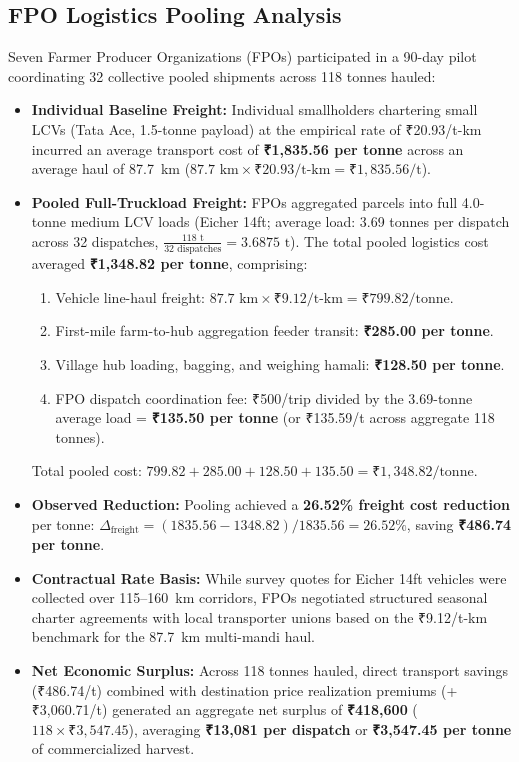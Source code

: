 \documentclass[journal]{IEEEtran}
\begin{document}
\subsection{FPO Logistics Pooling Analysis}
Seven Farmer Producer Organizations (FPOs) participated in a 90-day pilot coordinating 32 collective pooled shipments across 118 tonnes hauled:
\begin{itemize}
    \item \textbf{Individual Baseline Freight:} Individual smallholders chartering small LCVs (Tata Ace, 1.5-tonne payload) at the empirical rate of ₹20.93/t-km incurred an average transport cost of \textbf{₹1,835.56 per tonne} across an average haul of 87.7~km ($87.7\text{ km} \times \text{₹}20.93/\text{t-km} = \text{₹}1,835.56/\text{t}$).
    \item \textbf{Pooled Full-Truckload Freight:} FPOs aggregated parcels into full 4.0-tonne medium LCV loads (Eicher 14ft; average load: 3.69 tonnes per dispatch across 32 dispatches, $\frac{118\text{ t}}{32\text{ dispatches}} = 3.6875\text{ t}$). The total pooled logistics cost averaged \textbf{₹1,348.82 per tonne}, comprising:
    \begin{enumerate}
        \item Vehicle line-haul freight: $87.7\text{ km} \times \text{₹}9.12/\text{t-km} = \text{₹}799.82/\text{tonne}$.
        \item First-mile farm-to-hub aggregation feeder transit: \textbf{₹285.00 per tonne}.
        \item Village hub loading, bagging, and weighing hamali: \textbf{₹128.50 per tonne}.
        \item FPO dispatch coordination fee: ₹500/trip divided by the 3.69-tonne average load = \textbf{₹135.50 per tonne} (or ₹135.59/t across aggregate 118 tonnes).
    \end{enumerate}
    Total pooled cost: $799.82 + 285.00 + 128.50 + 135.50 = \text{₹}1,348.82/\text{tonne}$.
    \item \textbf{Observed Reduction:} Pooling achieved a \textbf{26.52\% freight cost reduction} per tonne: $\Delta_{\text{freight}} = (1835.56 - 1348.82) / 1835.56 = 26.52\%$, saving \textbf{₹486.74 per tonne}.
    \item \textbf{Contractual Rate Basis:} While survey quotes for Eicher 14ft vehicles were collected over 115--160~km corridors, FPOs negotiated structured seasonal charter agreements with local transporter unions based on the ₹9.12/t-km benchmark for the 87.7~km multi-mandi haul.
    \item \textbf{Net Economic Surplus:} Across 118 tonnes hauled, direct transport savings (₹486.74/t) combined with destination price realization premiums (+₹3,060.71/t) generated an aggregate net surplus of \textbf{₹418,600} ($118 \times \text{₹}3,547.45$), averaging \textbf{₹13,081 per dispatch} or \textbf{₹3,547.45 per tonne} of commercialized harvest.
\end{itemize}
\end{document}
